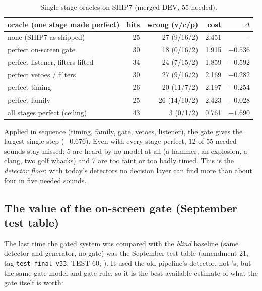 \begin{table}[h]
\centering\small
\caption{Single-stage oracles on SHIP7 (merged DEV, 55 needed).}
\label{tab:ceiling}
\begin{tabular}{lrrrr}
\toprule
oracle (one stage made perfect) & hits & wrong (v/c/p) & cost & $\Delta$ \\
\midrule
none (SHIP7 as shipped) & 25 & 27 (9/16/2) & 2.451 & -- \\
perfect on-screen gate & 30 & 18 (0/16/2) & 1.915 & $-0.536$ \\
perfect listener, filters lifted & 34 & 24 (7/15/2) & 1.859 & $-0.592$ \\
perfect vetoes / filters & 30 & 27 (9/16/2) & 2.169 & $-0.282$ \\
perfect timing & 26 & 20 (11/7/2) & 2.197 & $-0.254$ \\
perfect family & 25 & 26 (14/10/2) & 2.423 & $-0.028$ \\
\midrule
all stages perfect (ceiling) & 43 & 3 (0/1/2) & 0.761 & $-1.690$ \\
\bottomrule
\end{tabular}
\end{table}

Applied in sequence (timing, family, gate, vetoes, listener), the gate gives the largest single step ($-0.676$). Even
with every stage perfect, 12 of 55 needed sounds stay missed: 5 are heard by no model at all (a hammer, an explosion,
a clang, two golf whacks) and 7 are too faint or too badly timed. This is the \emph{detector floor}: with today's
detectors no decision layer can find more than about four in five needed sounds.

\subsection{The value of the on-screen gate (September test table)}\label{sec:sept-table}
The last time the gated system was compared with the \emph{blind} baseline (same detector and generator, no gate) was
the September test table (amendment 21, tag \texttt{test\_final\_v33}, TEST-60; ).
It used the old pipeline's detector, not \Dp's, but the same gate model and gate rule, so it is the best available
estimate of what the gate itself is worth:

